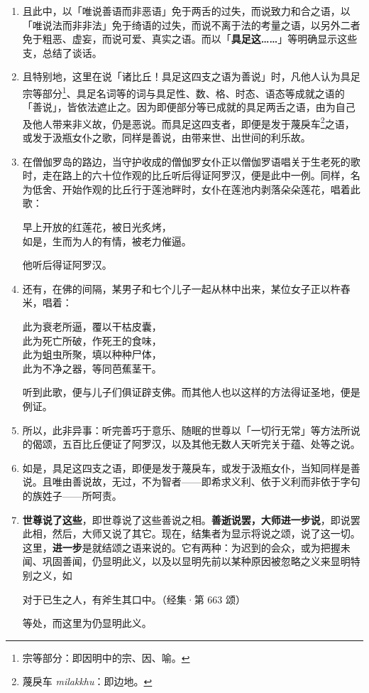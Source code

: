 \begin{enumerate}
\item 且此中，以「唯说善语而非恶语」免于两舌的过失，而说致力和合之语，以「唯说法而非非法」免于绮语的过失，而说不离于法的考量之语，以另外二者免于粗恶、虚妄，而说可爱、真实之语。而以「\textbf{具足这……}」等明确显示这些支，总结了谈话。
\item 且特别地，这里在说「诸比丘！具足这四支之语为善说」时，凡他人认为具足宗等部分\footnote{宗等部分：即因明中的宗、因、喻。}、具足名词等的词与具足性、数、格、时态、语态等成就之语的「善说」，皆依法遮止之。因为即便部分等已成就的具足两舌之语，由为自己及他人带来非义故，仍是恶说。而具足这四支者，即便是发于蔑戾车\footnote{蔑戾车 \textit{milakkhu}：即边地。}之语，或发于汲瓶女仆之歌，同样是善说，由带来世、出世间的利乐故。
\item 在僧伽罗岛的路边，当守护收成的僧伽罗女仆正以僧伽罗语唱关于生老死的歌时，走在路上的六十位作观的比丘听后得证阿罗汉，便是此中一例。同样，名为低舍、开始作观的比丘行于莲池畔时，女仆在莲池内剥落朵朵莲花，唱着此歌：\begin{quoting}早上开放的红莲花，被日光炙烤，\\如是，生而为人的有情，被老力催逼。\end{quoting}他听后得证阿罗汉。
\item 还有，在佛的间隔，某男子和七个儿子一起从林中出来，某位女子正以杵舂米，唱着：\begin{quoting}此为衰老所逼，覆以干枯皮囊，\\此为死亡所破，作死王的食味，\\此为蛆虫所聚，填以种种尸体，\\此为不净之器，等同芭蕉茎干。\end{quoting}听到此歌，便与儿子们俱证辟支佛。而其他人也以这样的方法得证圣地，便是例证。
\item 所以，此非异事：听完善巧于意乐、随眠的世尊以「一切行无常」等方法所说的偈颂，五百比丘便证了阿罗汉，以及其他无数人天听完关于蕴、处等之说。
\item 如是，具足这四支之语，即便是发于蔑戾车，或发于汲瓶女仆，当知同样是善说。且唯由善说故，无过，不为智者——即希求义利、依于义利而非依于字句的族姓子——所呵责。
\item \textbf{世尊说了这些}，即世尊说了这些善说之相。\textbf{善逝说罢，大师进一步说}，即说罢此相，然后，大师又说了其它。现在，结集者为显示将说之颂，说了这一切。这里，\textbf{进一步}是就结颂之语来说的。它有两种：为迟到的会众，或为把握未闻、巩固善闻，仍显明此义，以及以显明先前以某种原因被忽略之义来显明特别之义，如\begin{quoting}对于已生之人，有斧生其口中。（经集·第 663 颂）\end{quoting}等处，而这里为仍显明此义。\end{enumerate}

